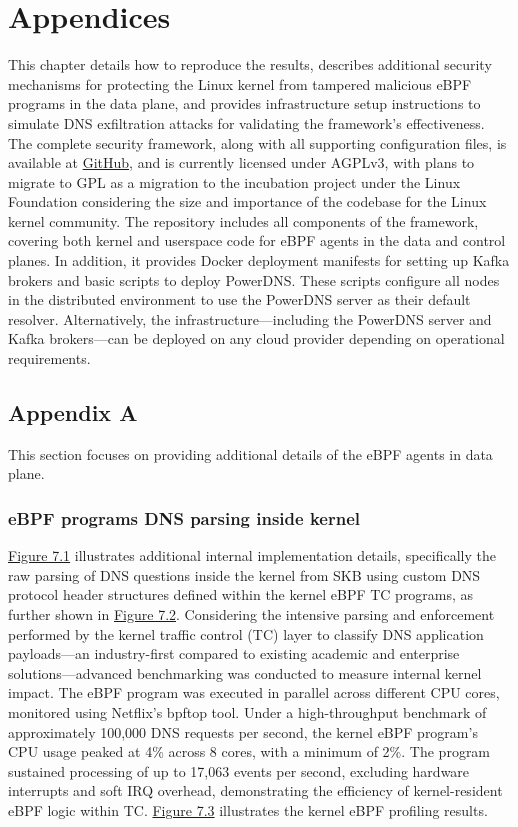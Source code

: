 \documentclass [11pt, proquest] {uwthesis}[2020/02/24]
\begin{document}
 





\chapter{Appendices}

This chapter details how to reproduce the results, describes additional security mechanisms for protecting the Linux kernel from tampered malicious eBPF programs in the data plane, and provides infrastructure setup instructions to simulate DNS exfiltration attacks for validating the framework’s effectiveness.
The complete security framework, along with all supporting configuration files, is available at \href{https://github.com/Synarcs/DNSObelisk}{GitHub}, and is currently licensed under AGPLv3, with plans to migrate to GPL as a migration to the incubation project under the Linux Foundation considering the size and importance of the codebase for the Linux kernel community. The repository includes all components of the framework, covering both kernel and userspace code for eBPF agents in the data and control planes. In addition, it provides Docker deployment manifests for setting up Kafka brokers and basic scripts to deploy PowerDNS. These scripts configure all nodes in the distributed environment to use the PowerDNS server as their default resolver. Alternatively, the infrastructure—including the PowerDNS server and Kafka brokers—can be deployed on any cloud provider depending on operational requirements.


\section{Appendix A}
This section focuses on providing additional details of the eBPF agents in data plane.

\subsection{eBPF programs DNS parsing inside kernel}
\hyperref[fig:c1]{Figure 7.1} illustrates additional internal implementation details, specifically the raw parsing of DNS questions inside the kernel from SKB using custom DNS protocol header structures defined within the kernel eBPF TC programs, as further shown in \hyperref[fig:c2]{Figure 7.2}. Considering the intensive parsing and enforcement performed by the kernel traffic control (TC) layer to classify DNS application payloads—an industry-first compared to existing academic and enterprise solutions—advanced benchmarking was conducted to measure internal kernel impact. The eBPF program was executed in parallel across different CPU cores, monitored using Netflix’s bpftop tool. Under a high-throughput benchmark of approximately 100,000 DNS requests per second, the kernel eBPF program’s CPU usage peaked at 4\% across 8 cores, with a minimum of 2\%. The program sustained processing of up to 17,063 events per second, excluding hardware interrupts and soft IRQ overhead, demonstrating the efficiency of kernel-resident eBPF logic within TC. \hyperref[fig:c3]{Figure 7.3} illustrates the kernel eBPF profiling results.
\end{document}
